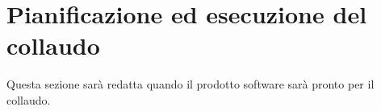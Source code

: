 %


\section{Pianificazione ed esecuzione del collaudo}
	Questa sezione sarà redatta quando il prodotto software sarà pronto per il collaudo.